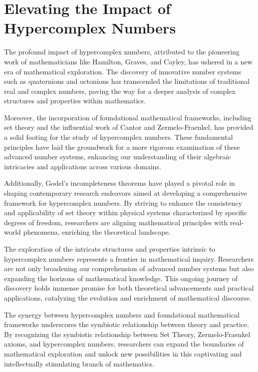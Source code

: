 \documentclass{article}
\begin{document}
\section{Elevating the Impact of Hypercomplex Numbers}

The profound impact of hypercomplex numbers, attributed to the pioneering work of mathematicians like Hamilton, Graves, and Cayley, has ushered in a new era of mathematical exploration. The discovery of innovative number systems such as quaternions and octonions has transcended the limitations of traditional real and complex numbers, paving the way for a deeper analysis of complex structures and properties within mathematics.

Moreover, the incorporation of foundational mathematical frameworks, including set theory and the influential work of Cantor and Zermelo-Fraenkel, has provided a solid footing for the study of hypercomplex numbers. These fundamental principles have laid the groundwork for a more rigorous examination of these advanced number systems, enhancing our understanding of their algebraic intricacies and applications across various domains.

Additionally, Godel's incompleteness theorems have played a pivotal role in shaping contemporary research endeavors aimed at developing a comprehensive framework for hypercomplex numbers. By striving to enhance the consistency and applicability of set theory within physical systems characterized by specific degrees of freedom, researchers are aligning mathematical principles with real-world phenomena, enriching the theoretical landscape.

The exploration of the intricate structures and properties intrinsic to hypercomplex numbers represents a frontier in mathematical inquiry. Researchers are not only broadening our comprehension of advanced number systems but also expanding the horizons of mathematical knowledge. This ongoing journey of discovery holds immense promise for both theoretical advancements and practical applications, catalyzing the evolution and enrichment of mathematical discourse.

The synergy between hypercomplex numbers and foundational mathematical frameworks underscores the symbiotic relationship between theory and practice. By recognizing the symbiotic relationship between Set Theory, Zermelo-Fraenkel axioms, and hypercomplex numbers, researchers can expand the boundaries of mathematical exploration and unlock new possibilities in this captivating and intellectually stimulating branch of mathematics.
\end{document}
